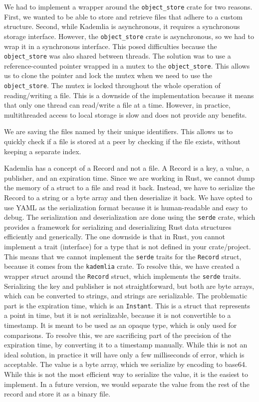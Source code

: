 We had to implement a wrapper around the \texttt{object\_store} crate for two reasons.
First, we wanted to be able to store and retrieve files that adhere to a custom structure.
Second, while Kademlia is asynchronous, it requires a synchronous storage interface.
However, the \texttt{object\_store} crate is asynchronous, so we had to wrap it in a synchronous interface.
This posed difficulties because the \texttt{object\_store} was also shared between threads.
The solution was to use a reference-counted pointer wrapped in a mutex to the \texttt{object\_store}.
This allows us to clone the pointer and lock the mutex when we need to use the \texttt{object\_store}.
The mutex is locked throughout the whole operation of reading/writing a file.
This is a downside of the implementation because it means that only one thread can read/write a file at a time.
However, in practice, multithreaded access to local storage is slow and does not provide any benefits.

We are saving the files named by their unique identifiers.
This allows us to quickly check if a file is stored at a peer by checking if the file exists, without keeping a separate index.

Kademlia has a concept of a Record and not a file.
A Record is a key, a value, a publisher, and an expiration time.
Since we are working in Rust, we cannot dump the memory of a struct to a file and read it back.
Instead, we have to serialize the Record to a string or a byte array and then deserialize it back.
We have opted to use YAML as the serialization format because it is human-readable and easy to debug.
The serialization and deserialization are done using the \texttt{serde} crate, which provides a framework for serializing and deserializing Rust data structures efficiently and generically.
The one downside is that in Rust, you cannot implement a trait (interface) for a type that is not defined in your crate/project.
This means that we cannot implement the \texttt{serde} traits for the \texttt{Record} struct, because it comes from the \texttt{kademlia} crate.
To resolve this, we have created a wrapper struct around the \texttt{Record} struct, which implements the \texttt{serde} traits.
Serializing the key and publisher is not straightforward, but both are byte arrays, which can be converted to strings, and strings are serializable.
The problematic part is the expiration time, which is an \texttt{Instant}.
This is a struct that represents a point in time, but it is not serializable, because it is not convertible to a timestamp.
It is meant to be used as an opaque type, which is only used for comparisons.
To resolve this, we are sacrificing part of the precision of the expiration time, by converting it to a timestamp manually.
While this is not an ideal solution, in practice it will have only a few milliseconds of error, which is acceptable.
The value is a byte array, which we serialize by encoding to base64.
While this is not the most efficient way to serialize the value, it is the easiest to implement.
In a future version, we would separate the value from the rest of the record and store it as a binary file.

